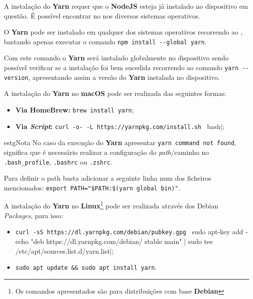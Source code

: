 \label{yarnAttachments}


A instalação do \textbf{Yarn} requer que o \textbf{NodeJS} esteja já instalado no dispositivo em questão. É possível encontrar no  nos diversos sistemas operativos.


O \textbf{Yarn} pode ser instalado em qualquer dos sistemas operativos recorrendo ao \textbf{}, bastando apenas executar o comando \verb|npm install --global yarn|.

Com este comando o \textbf{Yarn} será instalado globalmente no dispositivo sendo possível verificar se a instalação foi bem sucedida recorrendo ao comando \verb|yarn --version|, apresentando assim a versão do \textbf{Yarn} instalada no dispositivo. 


A instalação do \textbf{Yarn} no \textbf{macOS} pode ser realizada das seguintes formas:

\begin{itemize}
	\item \textbf{Via HomeBrew:} \verb|brew install yarn|;
	\item \textbf{Via \textit{Script}:} \verb|curl -o- -L https://yarnpkg.com/install.sh | bash|; 
\end{itemize}

\begin{mybox}{estg}{Nota}
	No caso da execução do \textbf{Yarn} apresentar \verb|yarn command not found|, significa que é necessário realizar a configuração do \textit{path}/caminho no \verb|.bash_profile|, \verb|.bashrc| ou \verb|.zshrc|.
	
	\vspace{5pt}
	
	Para definir o path basta adicionar a seguinte linha num dos ficheiros mencionados: \verb|export PATH="$PATH:$(yarn global bin)"|.
\end{mybox}


A instalação do \textbf{Yarn} no \textbf{Linux}\footnote{Os comandos apresentados são para distribuições com base \textbf{Debian}} pode ser realizada através dos Debian \textit{Packages}, para isso:

\begin{itemize}
	\item \verb|curl -sS https://dl.yarnpkg.com/debian/pubkey.gpg | sudo apt-key add -
echo "deb https://dl.yarnpkg.com/debian/ stable main" | sudo tee /etc/apt/sources.list.d/yarn.list|;
	\item \verb|sudo apt update && sudo apt install yarn|.
\end{itemize}

